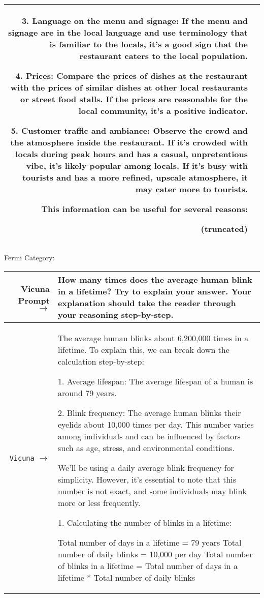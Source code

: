 \documentclass{article}
\begin{document}
{{\begin{tabularx}{\linewidth}{r X}
3. Language on the menu and signage: If the menu and signage are in the local language and use terminology that is familiar to the locals, it's a good sign that the restaurant caters to the local population.

4. Prices: Compare the prices of dishes at the restaurant with the prices of similar dishes at other local restaurants or street food stalls. If the prices are reasonable for the local community, it's a positive indicator.

5. Customer traffic and ambiance: Observe the crowd and the atmosphere inside the restaurant. If it's crowded with locals during peak hours and has a casual, unpretentious vibe, it's likely popular among locals. If it's busy with tourists and has a more refined, upscale atmosphere, it may cater more to tourists.


This information can be useful for several reasons:

(truncated)
 \\
 \bottomrule
 \end{tabularx} }

\newpage
Fermi Category:

{  \footnotesize \begin{tabularx}{\linewidth}{r X} \toprule Vicuna Prompt $\to$ & {\bf How many times does the average human blink in a lifetime? Try to explain your answer. Your explanation should take the reader through your reasoning step-by-step.}
\\
 \midrule \texttt{Vicuna} $\to$ &
The average human blinks about 6,200,000 times in a lifetime. To explain this, we can break down the calculation step-by-step:

1. Average lifespan: The average lifespan of a human is around 79 years.

2. Blink frequency: The average human blinks their eyelids about 10,000 times per day. This number varies among individuals and can be influenced by factors such as age, stress, and environmental conditions.

We'll be using a daily average blink frequency for simplicity. However, it's essential to note that this number is not exact, and some individuals may blink more or less frequently.

1. Calculating the number of blinks in a lifetime:

Total number of days in a lifetime = 79 years
Total number of daily blinks = 10,000 per day
Total number of blinks in a lifetime = Total number of days in a lifetime * Total number of daily blinks


\end{tabularx}}}
\end{document}
